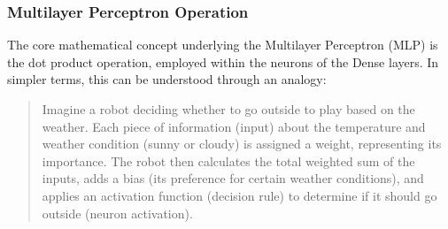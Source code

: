 


\subsubsection{Multilayer Perceptron Operation}

The core mathematical concept underlying the Multilayer Perceptron (MLP) is the dot product operation, employed within the neurons of the Dense layers. In simpler terms, this can be understood through an analogy:

\begin{quote}
Imagine a robot deciding whether to go outside to play based on the weather. Each piece of information (input) about the temperature and weather condition (sunny or cloudy) is assigned a weight, representing its importance. The robot then calculates the total weighted sum of the inputs, adds a bias (its preference for certain weather conditions), and applies an activation function (decision rule) to determine if it should go outside (neuron activation).
\end{quote}

